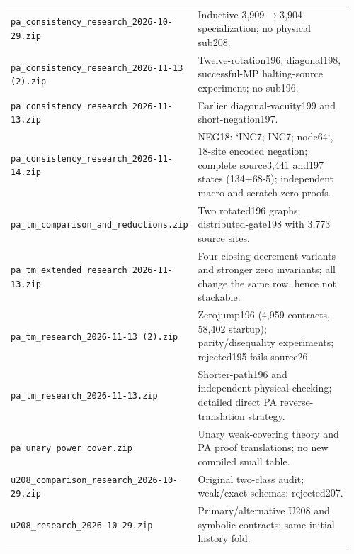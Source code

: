 \begin{longtable}{@{}p{0.43\linewidth}p{0.53\linewidth}@{}}
\nolinkurl{pa_consistency_research_2026-10-29.zip} & Inductive 3,909$\to$3,904 specialization; no physical sub208.\\[4pt]
\nolinkurl{pa_consistency_research_2026-11-13 (2).zip} & Twelve-rotation196, diagonal198, successful-MP halting-source experiment; no sub196.\\[4pt]
\nolinkurl{pa_consistency_research_2026-11-13.zip} & Earlier diagonal-vacuity199 and short-negation197.\\[4pt]
\nolinkurl{pa_consistency_research_2026-11-14.zip} & NEG18: `INC7; INC7; node64`, 18-site encoded negation; complete source3,441 and197 states (134+68-5); independent macro and scratch-zero proofs.\\[4pt]
\nolinkurl{pa_tm_comparison_and_reductions.zip} & Two rotated196 graphs; distributed-gate198 with 3,773 source sites.\\[4pt]
\nolinkurl{pa_tm_extended_research_2026-11-13.zip} & Four closing-decrement variants and stronger zero invariants; all change the same row, hence not stackable.\\[4pt]
\nolinkurl{pa_tm_research_2026-11-13 (2).zip} & Zerojump196 (4,959 contracts, 58,402 startup); parity/disequality experiments; rejected195 fails source26.\\[4pt]
\nolinkurl{pa_tm_research_2026-11-13.zip} & Shorter-path196 and independent physical checking; detailed direct PA reverse-translation strategy.\\[4pt]
\nolinkurl{pa_unary_power_cover.zip} & Unary weak-covering theory and PA proof translations; no new compiled small table.\\[4pt]
\nolinkurl{u208_comparison_research_2026-10-29.zip} & Original two-class audit; weak/exact schemas; rejected207.\\[4pt]
\nolinkurl{u208_research_2026-10-29.zip} & Primary/alternative U208 and symbolic contracts; same initial history fold.\\[4pt]
\end{longtable}\normalsize
